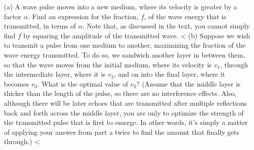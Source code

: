 (a) A wave pulse moves into a new medium, where its velocity is greater
by a factor $\alpha$. Find an expression for the fraction, $f$, of the wave
energy that is transmitted, in terms of $\alpha$. Note that, as discussed
in the text, you cannot simply find $f$ by squaring the amplitude of the
transmitted wave. <%
(b) Suppose we wish to transmit a pulse
from one medium to another, maximizing the fraction of the wave energy
transmitted.
To do so, we sandwich another layer in between them, so that the
wave moves from the initial medium, where its velocity is $v_1$, through
the intermediate layer, where it is $v_2$, and on into the final layer, where it
becomes $v_3$. What is the optimal value of $v_2$?
(Assume that the middle layer is thicker than the
length of the pulse, so there are no interference effects. Also, although
there will be later echoes that are transmitted after multiple reflections
back and forth across the middle layer, you are only to optimize the
strength of the transmitted pulse that is first to emerge. In other words, it's simply
a matter of applying your answer from part a twice to find the amount
that finally gets through.) 
<%
